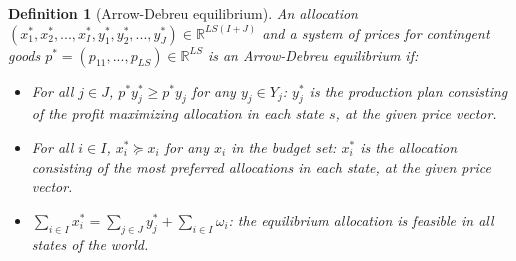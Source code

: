 \documentclass[12pt]{report}
\newtheorem{definition}{Definition}[chapter]
\begin{document}
\begin{definition}[Arrow-Debreu equilibrium]
An allocation $(x_1^*, x_2^*, ..., x_I^*, y_1^*, y_2^*, ..., y_J^*)\in \mathbb{R}^{LS(I+J)}$ and a system of prices for contingent goods $p^* = (p_{11}, ..., p_{LS})\in \mathbb{R}^{LS}$ is an Arrow-Debreu equilibrium if:\begin{itemize}
\item For all $j\in J$, $p^*y_j^*\geq p^*y_j$ for any $y_j\in Y_j$: $y_j^*$ is the production plan consisting of the profit maximizing allocation in each state $s$, at the given price vector.
\item For all $i\in I$, $x_i^*\succeq x_i$ for any $x_i$ in the budget set: $x_i^*$ is the allocation consisting of the most preferred allocations in each state, at the given price vector.
\item $\sum_{i\in I} x_i^* = \sum_{j\in J} y_j^* + \sum_{i\in I} \omega_i $: the equilibrium allocation is feasible in all states of the world.
\end{itemize}
\end{definition}
\end{document}
